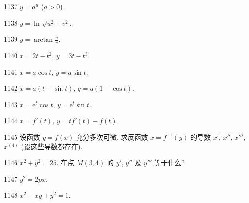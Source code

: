 \begin{prob}[S]{1137}
$y = a^u$ ($a > 0$).
\end{prob}

\begin{prob}[S]{1138}
$y = \ln\sqrt{u^2 + v^2}$.
\end{prob}

\begin{prob}[S]{1139}
$y = \arctan\frac{u}{v}$.
\end{prob}


\begin{prob}[S]{1140}
$x = 2t - t^2$, $y = 3t - t^3$.
\end{prob}

\begin{prob}[S]{1141}
$x = a\cos t$, $y = a\sin t$.
\end{prob}

\begin{prob}[S]{1142}
$x = a(t - \sin t)$, $y = a(1 - \cos t)$.
\end{prob}

\begin{prob}[S]{1143}
$x = \mathrm{e}^t \cos t$, $y = \mathrm{e}^t \sin t$.
\end{prob}

\begin{prob}[S]{1144}
$x = f'(t)$, $y = t f'(t) - f(t)$.
\end{prob}

\begin{prob}[M]{1145}
设函数 $y = f(x)$ 充分多次可微. 求反函数 $x = f^{-1}(y)$ 的导数 $x'$, $x''$, $x'''$, $x^{(4)}$ (设这些导数都存在).
\end{prob}


\begin{prob}[M]{1146}
$x^2 + y^2 = 25$. 在点 $M(3, 4)$ 的 $y'$, $y''$ 及 $y'''$ 等于什么?
\end{prob}

\begin{prob}[S]{1147}
$y^2 = 2px$.
\end{prob}

\begin{prob}[S]{1148}
$x^2 - xy + y^2 = 1$.
\end{prob}


